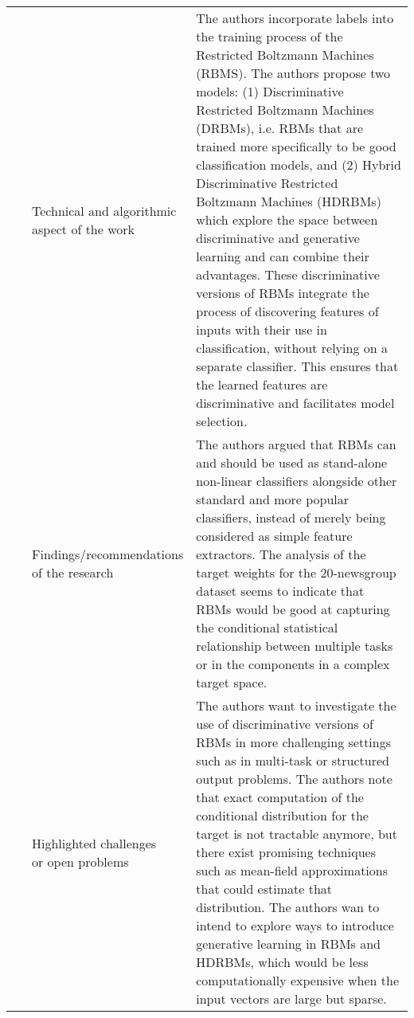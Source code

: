 \begin{landscape}
\begin{longtable}{lp{}p{}}
	\multirow{3}[0]{*}{~\citep{Larochelle2008}} & 
    \specialcell{Technical and algorithmic \\ aspect of the work} &
    The authors incorporate labels into the training process of the Restricted Boltzmann Machines (RBMS). The authors propose two models: (1) Discriminative Restricted Boltzmann Machines (DRBMs), i.e. RBMs that are trained more specifically to be good classification models, and (2) Hybrid Discriminative Restricted Boltzmann Machines (HDRBMs) which explore the space between discriminative and generative learning and can combine their advantages. These discriminative versions of RBMs integrate the process of discovering features of inputs with their use in classification, without relying on a separate classifier. This ensures that the learned features are discriminative and facilitates model selection.     
    \\ & 
    \specialcell{Findings/recommendations \\ of the research} & 
    The authors argued that RBMs can and should be used as stand-alone non-linear classifiers alongside other standard and more popular classifiers, instead of merely being considered as simple feature extractors. The analysis of the target weights for the 20-newsgroup dataset seems to indicate that RBMs would be good at capturing the conditional statistical relationship between multiple tasks or in the components in a complex target space.
    \\ & 
    \specialcell{Highlighted challenges \\ or open problems} & 
    The authors want to investigate the use of discriminative versions of RBMs in more challenging settings such as in multi-task or structured output problems.  The authors note that exact computation of the conditional distribution for the target is not tractable anymore, but there exist promising techniques such as mean-field approximations that could estimate that distribution. The authors wan to intend to explore ways to introduce generative learning in RBMs and HDRBMs, which would be less computationally expensive when the input vectors are large but sparse.  
    \\
	

\end{longtable}
\end{landscape}
